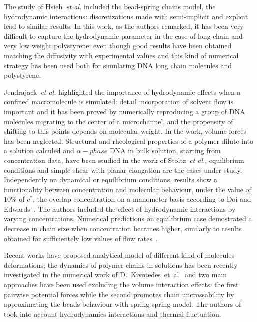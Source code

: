 The study of Hsieh~\emph{et al.}\cite{hsieh} included the bead-spring chains model, the hydrodynamic interactions: discretizations made with semi-implicit and explicit lead to similar results. In this work, as the authors remarked, it has been very difficult to capture the hydrodynamic parameter in the case of long chain and very low weight polystyrene;
even though good results have been obtained matching the diffusivity with experimental values and this kind of numerical strategy has been used both for simulating DNA long chain molecules and polystyrene. 

Jendrajack~\emph{et al.}\cite{jendrejack} highlighted the importance of hydrodynamic effects when a confined macromolecule is simulated: detail incorporation of solvent flow is important and it has been proved by numerically reproducing a group of DNA molecules migrating to the center of a microchannel, and the propensity of shifting to this points depends on molecular weight. In the work, volume forces has been neglected.
Structural and rheological properties of a polymer dilute into a solution 
calculed and $\alpha-phase$ DNA in bulk solution,
starting from concentration data, have been studied in the work of Stoltz~\emph{et al.}\cite{stoltz},
equilibrium conditions and simple shear with planar elongation are the cases under study.
Independently on dynamical or equilibrium conditions, results show a functionality between concentration and molecular behaviour, under the value of $10\%$ of $c^*$, the overlap concentration on a manometer basis according to Doi and Edwards~\cite{edwards}. The authors included the effect of hydrodynamic interactions by varying concentrations. Numerical predictions on equilibrium case demostrated a decrease in chain size when concentration becames higher, similarly to results obtained for sufficientely low values of flow rates~\cite{Taylor}.








Recent works have proposed analytical model of different kind of molecules deformations; the dynamics of polymer chains in solutions has been recently investigated in the numerical work of D.~Kivotedes~et~al~\cite{demos1} and two main approaches have been used excluding the volume interaction effects: 
the first pairwise potential forces while the second promotes chain uncrossability by approximating the beads behaviour with spring-spring model.
The authors of~\cite{demos1}  took into account hydrodynamics interactions and thermal fluctuation.  

